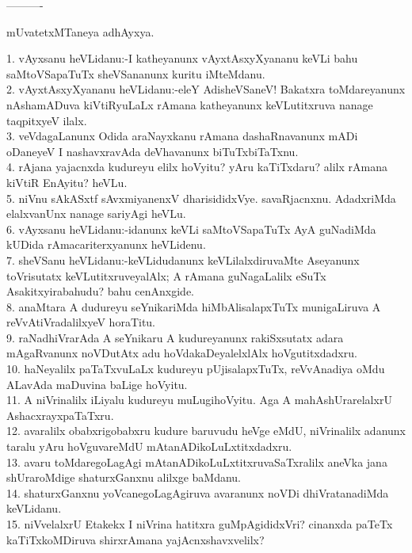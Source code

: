 \documentclass{article}
\begin{document}
\begin{center}
----------
\end{center}

\begin{center}
mUvatetxMTaneya adhAyxya.
\end{center}

1. vAyxsanu heVLidanu:-I katheyanunx vAyxtAsxyXyananu keVLi bahu saMtoVSapaTuTx sheVSananunx kuritu iMteMdanu.\\
2. vAyxtAsxyXyananu heVLidanu:-eleY AdisheVSaneV! Bakatxra toMdareyanunx nAshamADuva kiVtiRyuLaLx rAmana katheyanunx keVLutitxruva nanage taqpitxyeV ilalx.\\
3. veVdagaLanunx Odida araNayxkanu rAmana dashaRnavanunx mADi oDaneyeV I nashavxravAda deVhavanunx biTuTxbiTaTxnu.\\
4. rAjana yajacnxda kudureyu elilx hoVyitu? yAru kaTiTxdaru? alilx rAmana kiVtiR EnAyitu? heVLu.\\
5. niVnu sAkASxtf sAvxmiyanenxV dharisididxVye. savaRjacnxnu. AdadxriMda elalxvanUnx nanage sariyAgi heVLu.\\
6. vAyxsanu heVLidanu:-idanunx keVLi saMtoVSapaTuTx AyA guNadiMda kUDida rAmacariterxyanunx heVLidenu.\\
7. sheVSanu heVLidanu:-keVLidudanunx keVLilalxdiruvaMte Aseyanunx toVrisutatx keVLutitxruveyalAlx; A rAmana guNagaLalilx eSuTx Asakitxyirabahudu? bahu cenAnxgide.\\
8. anaMtara A dudureyu seYnikariMda hiMbAlisalapxTuTx munigaLiruva A reVvAtiVradalilxyeV horaTitu.\\
9. raNadhiVrarAda A seYnikaru A kudureyanunx rakiSxsutatx adara mAgaRvanunx noVDutAtx adu hoVdakaDeyalelxlAlx hoVgutitxdadxru.\\
10. haNeyalilx paTaTxvuLaLx kudureyu pUjisalapxTuTx, reVvAnadiya oMdu ALavAda maDuvina baLige hoVyitu.\\
11. A niVrinalilx iLiyalu kudureyu muLugihoVyitu. Aga A mahAshUrarelalxrU AshacxrayxpaTaTxru.\\
12. avaralilx obabxrigobabxru kudure baruvudu heVge eMdU, niVrinalilx adanunx taralu yAru hoVguvareMdU mAtanADikoLuLxtitxdadxru.\\
13. avaru toMdaregoLagAgi mAtanADikoLuLxtitxruvaSaTxralilx aneVka jana shUraroMdige shaturxGanxnu alilxge baMdanu.\\
14. shaturxGanxnu yoVcanegoLagAgiruva avaranunx noVDi dhiVratanadiMda keVLidanu.\\
15. niVvelalxrU Etakekx I niVrina hatitxra guMpAgididxVri? cinanxda paTeTx kaTiTxkoMDiruva shirxrAmana yajAcnxshavxvelilx?\\
\end{document}
